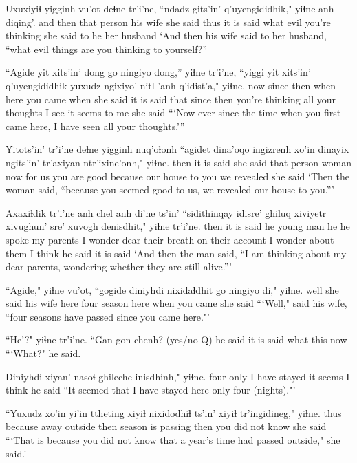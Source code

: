 \documentclass[12pt]{article}
\begin{document}
\gll Uxuxiyiɬ yigginh vu'ot  deɬne tr'i'ne, ``ndadz gits'in' q'uyengididhik,"  yiɬne  anh diqing'.
{and then} {that person}  {his wife} {she said thus} {it is said} what evil {you're thinking} {she said to} he {her husband}
\glt `And then his wife said to her husband, ``what evil things are you thinking to yourself?''
\glend

\gll ``Agide {yit xits'in'} dong go ningiyo dong,''  yiɬne  tr'i'ne, ``yiggi {yit xits'in'} q'uyengididhik  yuxudz ngixiyo' nitl-'anh q'idist'a,"  yiɬne.
now {since then} when here {you came} when {she said} {it is said} that {since then} {you're thinking} all {your thoughts} {I see} {it seems to me} {she said}
\glt ```Now ever since the time when you first came here, I have seen all your thoughts.'''
\glend

\gll Yitots'in' tr'i'ne deɬne yigginh nuq'oɬonh ``agidet dina'oqo ingizrenh xo'in dinayix ngits'in' {tr'axiyan ntr'ixine'onh,"} yiɬne.
then  {it is said} {she said} {that person} woman now {for us} {you are good} because {our house} {to you} {we revealed} {she said}
\glt `Then the woman said, ``because you seemed good to us, we revealed our house to you.'''
\glend

\gll Axaxiɬdik tr'i'ne anh chel anh di'ne ts'in' ``sidithinqay idisre' ghiluq xiviyetr xivughun'  sre'  xuvogh denisdhit," yiɬne tr'i'ne.
then  {it is said} he {young man} he {he spoke} {} {my parents} {I wonder} dear {their breath} {on their account} {I wonder} {about them} {I think} {he said} {it is said}
\glt `And then the man said, ``I am thinking about my dear parents, wondering whether they are still alive.'''
\glend

\gll ``Agide," yiɬne vu'ot, ``gogide diniyhdi nixidaɬdhit  go {ningiyo di,"}  yiɬne.
well  {she said} {his wife} here four season here {when you came} {she said}
\glt ```Well," said his wife, ``four seasons have passed since you came here."'
\glend

\gll ``He'?" yiɬne tr'i'ne. ``Gan gon chenh?
{(yes/no Q)} {he said} {it is said} what this now
\glt ```What?" he said. 
\glend

\gll Diniyhdi xiyan'  nasoɬ  ghileche inisdhinh," yiɬne.
four only {I have stayed} {it seems} {I think} {he said}
\glt ``It seemed that I have stayed here only four (nights)."'
\glend

\gll ``Yuxudz xo'in  yi'in  ttheting xiyiɬ nixidodhiɬ ts'in' xiyiɬ {tr'ingidineg,"} yiɬne.
thus  because away  outside then {season is passing} {} then {you did not know} {she said}
\glt ```That is because you did not know that a year's time had passed outside," she said.'
\glend
\end{document}
